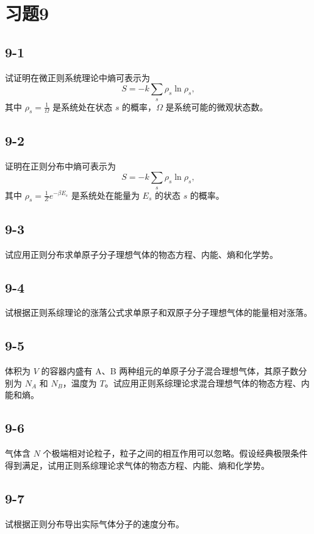\section{习题9}


\newpage
\subsection{9-1}
试证明在微正则系统理论中熵可表示为
$$ S = -k \sum_{s} \rho_{s} \ln \rho_{s}, $$
其中 $\rho_{s} = \frac{1}{\Omega}$ 是系统处在状态 $s$ 的概率，$\Omega$ 是系统可能的微观状态数。

\newpage
\subsection{9-2}
证明在正则分布中熵可表示为
$$ S = -k \sum_{s} \rho_{s} \ln \rho_{s}, $$
其中 $\rho_{s} = \frac{1}{Z} e^{-\beta E_{s}}$ 是系统处在能量为 $E_{s}$ 的状态 $s$ 的概率。

\newpage
\subsection{9-3}
试应用正则分布求单原子分子理想气体的物态方程、内能、熵和化学势。

\newpage
\subsection{9-4}
试根据正则系综理论的涨落公式求单原子和双原子分子理想气体的能量相对涨落。

\newpage
\subsection{9-5}
体积为 $V$ 的容器内盛有 A、B 两种组元的单原子分子混合理想气体，其原子数分别为 $N_A$ 和 $N_B$，温度为 $T$。试应用正则系综理论求混合理想气体的物态方程、内能和熵。

\newpage
\subsection{9-6}
气体含 $N$ 个极端相对论粒子，粒子之间的相互作用可以忽略。假设经典极限条件得到满足，试用正则系综理论求气体的物态方程、内能、熵和化学势。

\newpage
\subsection{9-7}
试根据正则分布导出实际气体分子的速度分布。


